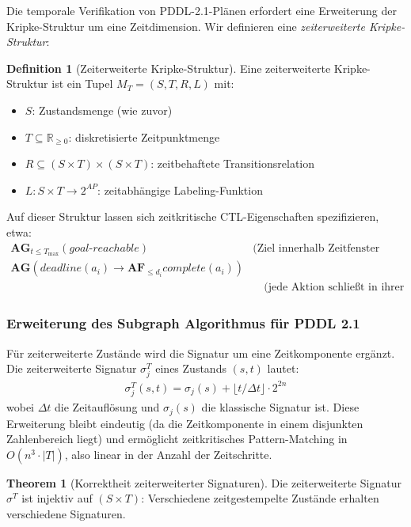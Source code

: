 ﻿\documentclass[a4paper,12pt]{article}
\theoremstyle{definition}
\newtheorem{definition}{Definition}[section]
\newtheorem{theorem}{Theorem}[section]
\begin{document}
Die temporale Verifikation von PDDL-2.1-Plänen erfordert eine Erweiterung der Kripke-Struktur um eine Zeitdimension. Wir definieren eine \emph{zeiterweiterte Kripke-Struktur}:

\begin{definition}[Zeiterweiterte Kripke-Struktur]
Eine zeiterweiterte Kripke-Struktur ist ein Tupel $M_T = (S, T, R, L)$ mit:
\begin{itemize}
  \item[-] $S$: Zustandsmenge (wie zuvor)
  \item[-] $T \subseteq \mathbb{R}_{\geq 0}$: diskretisierte Zeitpunktmenge
  \item[-] $R \subseteq (S \times T) \times (S \times T)$: zeitbehaftete Transitionsrelation
  \item[-] $L: S \times T \to 2^{AP}$: zeitabhängige Labeling-Funktion
\end{itemize}
\end{definition}

Auf dieser Struktur lassen sich zeitkritische CTL-Eigenschaften spezifizieren, etwa:
\begin{align}
  \mathbf{AG}_{t \leq T_{\max}}(\mathit{goal\text{-}reachable}) \quad &\text{(Ziel innerhalb Zeitfenster erreichbar)} \\
  \mathbf{AG}(\mathit{deadline}(a_i) \to \mathbf{AF}_{\leq d_i} \mathit{complete}(a_i)) \\
  &\quad\text{(jede Aktion schließt in ihrer Dauer ab)}
\end{align}

\subsubsection{Erweiterung des Subgraph Algorithmus für PDDL 2.1}

Für zeiterweiterte Zustände wird die Signatur um eine Zeitkomponente ergänzt. Die zeiterweiterte Signatur $\sigma_j^T$ eines Zustands $(s, t)$ lautet:
\begin{align}
  \sigma_j^T(s, t) = \sigma_j(s) + \lfloor t / \Delta t \rfloor \cdot 2^{2n}
\end{align}
wobei $\Delta t$ die Zeitauflösung und $\sigma_j(s)$ die klassische Signatur ist. Diese Erweiterung bleibt eindeutig (da die Zeitkomponente in einem disjunkten Zahlenbereich liegt) und ermöglicht zeitkritisches Pattern-Matching in $O(n^3 \cdot |T|)$, also linear in der Anzahl der Zeitschritte.

\begin{theorem}[Korrektheit zeiterweiterter Signaturen]
Die zeiterweiterte Signatur $\sigma^T$ ist injektiv auf $(S \times T)$: Verschiedene zeitgestempelte Zustände erhalten verschiedene Signaturen.
\end{theorem}
\end{document}
